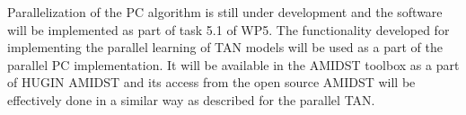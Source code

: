 Parallelization of the PC algorithm is still under development and the software will be implemented as part of task 5.1
of WP5. The functionality developed for implementing the parallel learning of TAN models will be used as a part of
the parallel PC implementation. It will be available in the AMIDST toolbox as a part of HUGIN AMIDST and its access from 
the open source AMIDST will be effectively done in a similar way as described for the parallel TAN.

%
%
